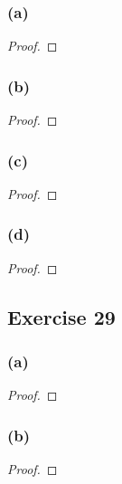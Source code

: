 \documentclass[14pt]{extarticle}
\begin{document}
\subsubsection{(a)}

\begin{proof}

\end{proof}

\subsubsection{(b)}

\begin{proof}

\end{proof}

\subsubsection{(c)}

\begin{proof}

\end{proof}

\subsubsection{(d)}

\begin{proof}

\end{proof}

\subsection{Exercise 29}

\subsubsection{(a)}

\begin{proof}

\end{proof}

\subsubsection{(b)}

\begin{proof}

\end{proof}
\end{document}
